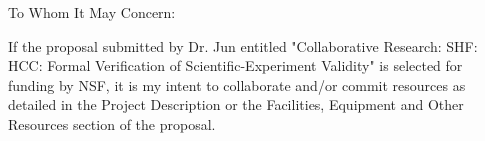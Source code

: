 To Whom It May Concern: 

If the proposal submitted by Dr. Jun entitled "Collaborative Research: SHF: HCC:
Formal Verification of Scientific-Experiment Validity" is selected for funding
by NSF, it is my intent to collaborate and/or commit resources as detailed in
the Project Description or the Facilities, Equipment and Other Resources section
of the proposal.